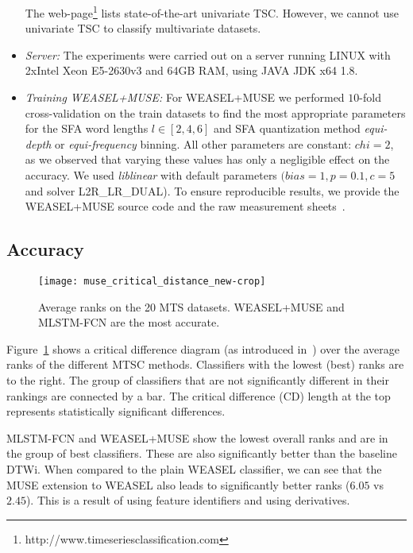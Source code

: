 \documentclass[sigconf]{acmart}
\begin{document}
\begin{itemize}
	The web-page\footnote{http://www.timeseriesclassification.com} lists state-of-the-art univariate TSC. However, we cannot use univariate TSC to classify multivariate datasets.
	\item \emph{Server:} The experiments were carried out on a server running LINUX with 2xIntel Xeon E5-2630v3 and 64GB RAM, using JAVA JDK x64 1.8. 
	\item \emph{Training WEASEL+MUSE:} For WEASEL+MUSE we performed $10$-fold cross-validation on the train datasets to find the most appropriate parameters for the SFA word lengths $l\in\left[2,4,6\right]$ and SFA quantization method \emph{equi-depth} or \emph{equi-frequency} binning.  All other parameters are constant: $chi=2$, as we observed that varying these values has only a negligible effect on the accuracy. We used \emph{liblinear} with default parameters $(\textit{bias}=1, p=0.1, c=5$ and solver L2R\_LR\_DUAL). To ensure reproducible results, we provide the WEASEL+MUSE source code and the raw measurement sheets~\cite{MUSEWebPage}. 
\end{itemize}

\subsection{Accuracy}

\begin{figure}[t]
	\begin{centering}
		\texttt{[image: muse\_critical\_distance\_new-crop]}
	\end{centering}
	\caption{Average ranks on the 20 MTS datasets. WEASEL+MUSE and MLSTM-FCN are the most accurate.\label{fig:Average-Ranks-on}}
\end{figure}

Figure~\ref{fig:Average-Ranks-on} shows a critical difference diagram (as introduced in~\cite{demvsar2006statistical}) over the average ranks of the different MTSC methods. Classifiers with the lowest (best) ranks are to the right. The group of classifiers that are not significantly different in their rankings are connected by a bar. The critical difference (CD) length at the top represents statistically significant differences. 

MLSTM-FCN and WEASEL+MUSE show the lowest overall ranks and are in the group of best classifiers. These are also significantly better than the baseline DTWi. When compared to the plain WEASEL classifier, we can see that the MUSE extension to WEASEL also leads to significantly better ranks ($6.05$ vs $2.45$). This is a result of using feature identifiers and using derivatives.
\end{document}
